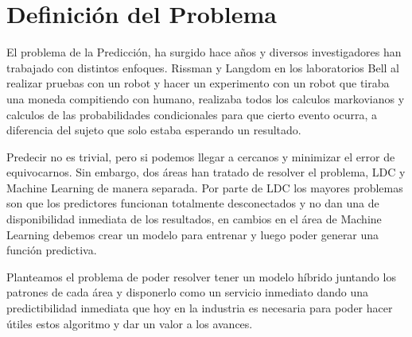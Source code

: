 

\section{Definición del Problema}


El problema de la Predicción, ha surgido hace años y diversos investigadores han trabajado con distintos enfoques. Rissman y Langdom en los laboratorios Bell al realizar pruebas con un robot y hacer un experimento con un robot que tiraba una moneda compitiendo con humano, realizaba todos los calculos markovianos y calculos de las probabilidades condicionales para que cierto evento ocurra, a diferencia del sujeto que solo estaba esperando un resultado.

Predecir no es trivial, pero si podemos llegar a cercanos y minimizar el error de equivocarnos. Sin embargo, dos áreas han tratado de resolver el problema, LDC y Machine Learning de manera separada. Por parte de LDC los mayores problemas son que los predictores funcionan totalmente desconectados y no dan una de disponibilidad inmediata de los resultados, en cambios en el área de Machine Learning debemos crear un modelo para entrenar y luego poder generar una función predictiva.

Planteamos el problema de poder resolver tener un modelo híbrido juntando los patrones de cada área y disponerlo como un servicio inmediato dando una predictibilidad inmediata que hoy en la industria es necesaria para poder hacer útiles estos algoritmo y dar un valor a los avances.
 
